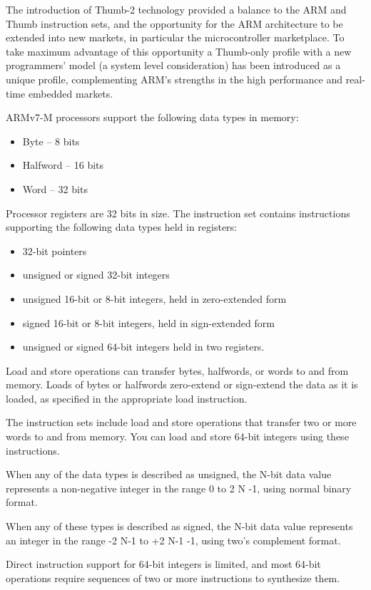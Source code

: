 \documentclass{report}
\begin{document}
		\par The introduction of Thumb-2 technology provided a balance to the ARM and Thumb instruction sets, and the opportunity for the ARM architecture to be extended into new markets, in particular the microcontroller marketplace. To take maximum advantage of this opportunity a Thumb-only profile with a new programmers’ model (a system level consideration) has been introduced as a unique profile, complementing ARM’s strengths in the high performance and real-time embedded markets.

		\par ARMv7-M processors support the following data types in memory:
		\begin{itemize}
			\item Byte -- 8 bits
			\item Halfword -- 16 bits
			\item Word -- 32 bits
		\end{itemize}
		
		\par Processor registers are 32 bits in size. The instruction set contains instructions supporting the following data
		types held in registers:
		\begin{itemize}
			\item 32-bit pointers
			\item unsigned or signed 32-bit integers
			\item unsigned 16-bit or 8-bit integers, held in zero-extended form
			\item signed 16-bit or 8-bit integers, held in sign-extended form
			\item unsigned or signed 64-bit integers held in two registers.
		\end{itemize}
		\par Load and store operations can transfer bytes, halfwords, or words to and from memory. Loads of bytes or halfwords zero-extend or sign-extend the data as it is loaded, as specified in the appropriate load instruction.
		\par The instruction sets include load and store operations that transfer two or more words to and from memory. You can load and store 64-bit integers using these instructions.
		\par When any of the data types is described as unsigned, the N-bit data value represents a non-negative integer in the range 0 to 2 N -1, using normal binary format.
		\par When any of these types is described as signed, the N-bit data value represents an integer in the range -2 N-1 to +2 N-1 -1, using two's complement format.
		\par Direct instruction support for 64-bit integers is limited, and most 64-bit operations require sequences of two or more instructions to synthesize them.
		
\end{document}
